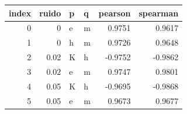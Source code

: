 \begin{tabular}{rrllrr}
\toprule
index & ruido & p & q & pearson & spearman \\
\midrule
0 & 0 & e & m & 0.9751 & 0.9617 \\
1 & 0 & h & m & 0.9726 & 0.9648 \\
2 & 0.02 & K & h & -0.9752 & -0.9862 \\
3 & 0.02 & e & m & 0.9747 & 0.9801 \\
4 & 0.05 & K & h & -0.9695 & -0.9868 \\
5 & 0.05 & e & m & 0.9673 & 0.9677 \\
\bottomrule
\end{tabular}
